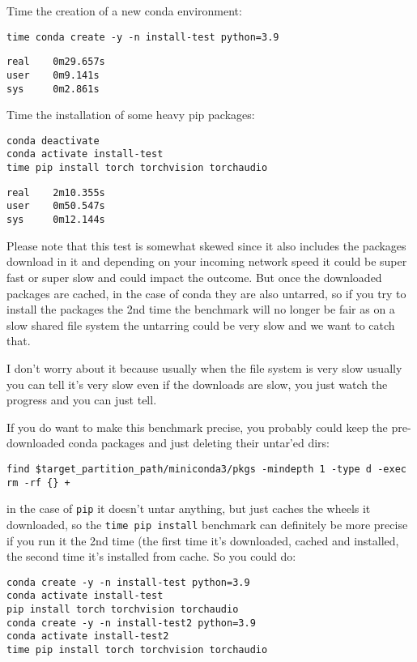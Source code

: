 \documentclass[
]{report}
\begin{document}
Time the creation of a new conda environment:

\begin{verbatim}
time conda create -y -n install-test python=3.9
\end{verbatim}

\begin{verbatim}
real    0m29.657s
user    0m9.141s
sys     0m2.861s
\end{verbatim}

Time the installation of some heavy pip packages:

\begin{verbatim}
conda deactivate
conda activate install-test
time pip install torch torchvision torchaudio
\end{verbatim}

\begin{verbatim}
real    2m10.355s
user    0m50.547s
sys     0m12.144s
\end{verbatim}

Please note that this test is somewhat skewed since it also includes the
packages download in it and depending on your incoming network speed it
could be super fast or super slow and could impact the outcome. But once
the downloaded packages are cached, in the case of conda they are also
untarred, so if you try to install the packages the 2nd time the
benchmark will no longer be fair as on a slow shared file system the
untarring could be very slow and we want to catch that.

I don't worry about it because usually when the file system is very slow
usually you can tell it's very slow even if the downloads are slow, you
just watch the progress and you can just tell.

If you do want to make this benchmark precise, you probably could keep
the pre-downloaded conda packages and just deleting their untar'ed dirs:

\begin{verbatim}
find $target_partition_path/miniconda3/pkgs -mindepth 1 -type d -exec rm -rf {} +
\end{verbatim}

in the case of \texttt{pip} it doesn't untar anything, but just caches
the wheels it downloaded, so the \texttt{time\ pip\ install} benchmark
can definitely be more precise if you run it the 2nd time (the first
time it's downloaded, cached and installed, the second time it's
installed from cache. So you could do:

\begin{verbatim}
conda create -y -n install-test python=3.9
conda activate install-test
pip install torch torchvision torchaudio
conda create -y -n install-test2 python=3.9
conda activate install-test2
time pip install torch torchvision torchaudio
\end{verbatim}
\end{document}
